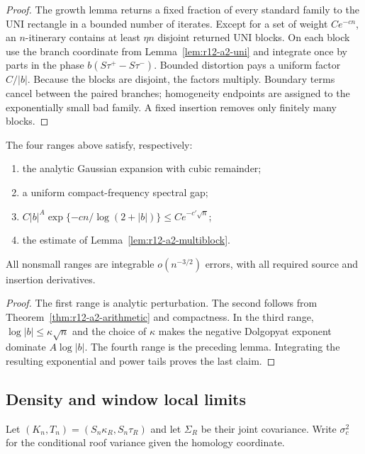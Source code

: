 \begin{proof}
The growth lemma returns a fixed fraction of every standard family to the UNI
rectangle in a bounded number of iterates.  Except for a set of weight
$Ce^{-cn}$, an $n$-itinerary contains at least $\eta n$ disjoint returned UNI
blocks.  On each block use the branch coordinate from
Lemma~\ref{lem:r12-a2-uni} and integrate once by parts in the phase
$b(S\tau^+-S\tau^-)$.  Bounded distortion pays a uniform factor $C/|b|$.
Because the blocks are disjoint, the factors multiply.  Boundary terms cancel
between the paired branches; homogeneity endpoints are assigned to the
exponentially small bad family.  A fixed insertion removes only finitely many
blocks.
\end{proof}

\begin{theorem}
\label{thm:r12-a2-fourier}
The four ranges above satisfy, respectively:
\begin{enumerate}[label=(\roman*)]
\item the analytic Gaussian expansion with cubic remainder;
\item a uniform compact-frequency spectral gap;
\item
$C|b|^A\exp\{-cn/\log(2+|b|)\}\le Ce^{-c'\sqrt n}$;
\item the estimate of Lemma~\ref{lem:r12-a2-multiblock}.
\end{enumerate}
All nonsmall ranges are integrable $o(n^{-3/2})$ errors, with all required
source and insertion derivatives.
\end{theorem}

\begin{proof}
The first range is analytic perturbation.  The second follows from
Theorem~\ref{thm:r12-a2-arithmetic} and compactness.  In the third range,
$\log|b|\le\kappa\sqrt n$ and the choice of $\kappa$ makes the negative
Dolgopyat exponent dominate $A\log|b|$.  The fourth range is the preceding
lemma.  Integrating the resulting exponential and power tails proves the last
claim.
\end{proof}

\subsection{Density and window local limits}

Let $(K_n,T_n)=(S_n\kappa_R,S_n\tau_R)$ and let $\Sigma_R$ be their joint
covariance.  Write $\sigma_c^2$ for the conditional roof variance given the
homology coordinate.

